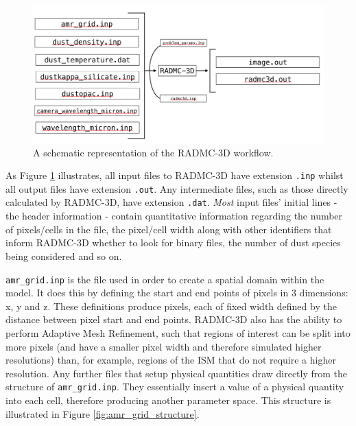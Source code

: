 \documentclass{report}
\begin{document}
\begin{figure}[h]
  \centering
  \includegraphics[scale=0.4]{../img/radmc3d-workflow}
  \caption[A schematic representation of the RADMC-3D workflow.]{A schematic representation of the RADMC-3D workflow.}
  \label{fig:radmc3d-workflow}
\end{figure}

As Figure \ref{fig:radmc3d-workflow} illustrates, all input files to RADMC-3D have extension \texttt{.inp} whilst all output files have extension \texttt{.out}. Any intermediate files, such as those directly calculated by RADMC-3D, have extension \texttt{.dat}. \textit{Most} input files' initial lines - the header information - contain quantitative information regarding the number of pixels/cells in the file, the pixel/cell width along with other identifiers that inform RADMC-3D whether to look for binary files, the number of dust species being considered and so on.

\texttt{amr\_grid.inp} is the file used in order to create a spatial domain within the model. It does this by defining the start and end points of pixels in 3 dimensions: x, y and z. These definitions produce pixels, each of fixed width defined by the distance between pixel start and end points. RADMC-3D also has the ability to perform Adaptive Mesh Refinement, such that regions of interest can be split into more pixels (and have a smaller pixel width and therefore simulated higher resolutions) than, for example, regions of the ISM that do not require a higher resolution. Any further files that setup physical quantities draw directly from the structure of \texttt{amr\_grid.inp}. They essentially \textquotesingle insert \textquotesingle a value of a physical quantity into each cell, therefore producing another parameter space. This structure is illustrated in Figure \ref{fig:amr_grid_structure}.
\end{document}
